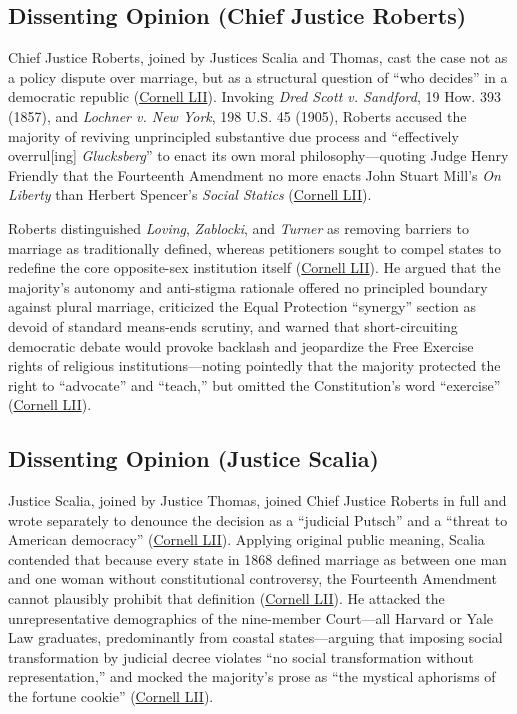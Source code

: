 \documentclass[12pt]{article}
\begin{document}
\subsection{Dissenting Opinion (Chief Justice Roberts)}

Chief Justice Roberts, joined by Justices Scalia and Thomas, cast the case not as a policy dispute over marriage, but as a structural question of ``who decides'' in a democratic republic (\href{https://www.law.cornell.edu/supremecourt/text/14-556}{Cornell LII}). Invoking \textit{Dred Scott v. Sandford}, 19 How. 393 (1857), and \textit{Lochner v. New York}, 198 U.S. 45 (1905), Roberts accused the majority of reviving unprincipled substantive due process and ``effectively overrul[ing] \textit{Glucksberg}'' to enact its own moral philosophy---quoting Judge Henry Friendly that the Fourteenth Amendment no more enacts John Stuart Mill's \textit{On Liberty} than Herbert Spencer's \textit{Social Statics} (\href{https://www.law.cornell.edu/supremecourt/text/14-556}{Cornell LII}).

Roberts distinguished \textit{Loving}, \textit{Zablocki}, and \textit{Turner} as removing barriers to marriage as traditionally defined, whereas petitioners sought to compel states to redefine the core opposite-sex institution itself (\href{https://www.law.cornell.edu/supremecourt/text/14-556}{Cornell LII}). He argued that the majority's autonomy and anti-stigma rationale offered no principled boundary against plural marriage, criticized the Equal Protection ``synergy'' section as devoid of standard means-ends scrutiny, and warned that short-circuiting democratic debate would provoke backlash and jeopardize the Free Exercise rights of religious institutions---noting pointedly that the majority protected the right to ``advocate'' and ``teach,'' but omitted the Constitution's word ``exercise'' (\href{https://www.law.cornell.edu/supremecourt/text/14-556}{Cornell LII}).

\subsection{Dissenting Opinion (Justice Scalia)}

Justice Scalia, joined by Justice Thomas, joined Chief Justice Roberts in full and wrote separately to denounce the decision as a ``judicial Putsch'' and a ``threat to American democracy'' (\href{https://www.law.cornell.edu/supremecourt/text/14-556}{Cornell LII}). Applying original public meaning, Scalia contended that because every state in 1868 defined marriage as between one man and one woman without constitutional controversy, the Fourteenth Amendment cannot plausibly prohibit that definition (\href{https://www.law.cornell.edu/supremecourt/text/14-556}{Cornell LII}). He attacked the unrepresentative demographics of the nine-member Court---all Harvard or Yale Law graduates, predominantly from coastal states---arguing that imposing social transformation by judicial decree violates ``no social transformation without representation,'' and mocked the majority's prose as ``the mystical aphorisms of the fortune cookie'' (\href{https://www.law.cornell.edu/supremecourt/text/14-556}{Cornell LII}).
\end{document}
